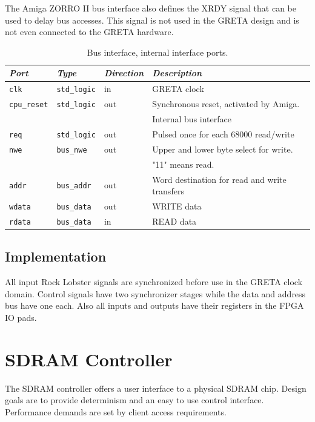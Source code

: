 \documentclass[a4paper]{report}
\begin{document}
The Amiga ZORRO II bus interface also defines the XRDY signal
that can be used to delay bus accesses. This signal is not
used in the GRETA design and is not even connected to the
GRETA hardware.

\begin{table}
\begin{tabular}{*4l}    \toprule
\emph{Port} & \emph{Type}  & \emph{Direction}  & \emph{Description} \\ \midrule
\texttt{clk}        & \texttt{std\_logic}& in  & GRETA clock\\
\texttt{cpu\_reset} & \texttt{std\_logic}& out & Synchronous reset, activated by Amiga. \\
\midrule
\midrule
                    &                   &       & Internal bus interface \\
\midrule
\texttt{req}        & \texttt{std\_logic}& out & Pulsed once for each 68000 read/write \\
\texttt{nwe}        & \texttt{bus\_nwe} & out  & Upper and lower byte select for write.\\
                    &                   &      & "11" means read. \\
\texttt{addr}       & \texttt{bus\_addr}& out  & Word destination for read and write transfers \\ 
\texttt{wdata}      & \texttt{bus\_data}& out  & WRITE data \\
\texttt{rdata}      & \texttt{bus\_data}& in   & READ data \\
\midrule
\bottomrule
 \hline
\end{tabular}
\caption{Bus interface, internal interface ports.}
\label{bus_interface}
\end{table}

\section{Implementation}
All input Rock Lobster signals are synchronized before use in
the GRETA clock domain.  Control signals have two synchronizer
stages while the data and address bus have one each. Also all
inputs and outputs have their registers in the FPGA IO pads.

\chapter{SDRAM Controller}
The SDRAM controller offers a user interface to a physical
SDRAM chip.  Design goals are to provide determinism and an
easy to use control interface.  Performance demands are set
by client access requirements.
\end{document}
